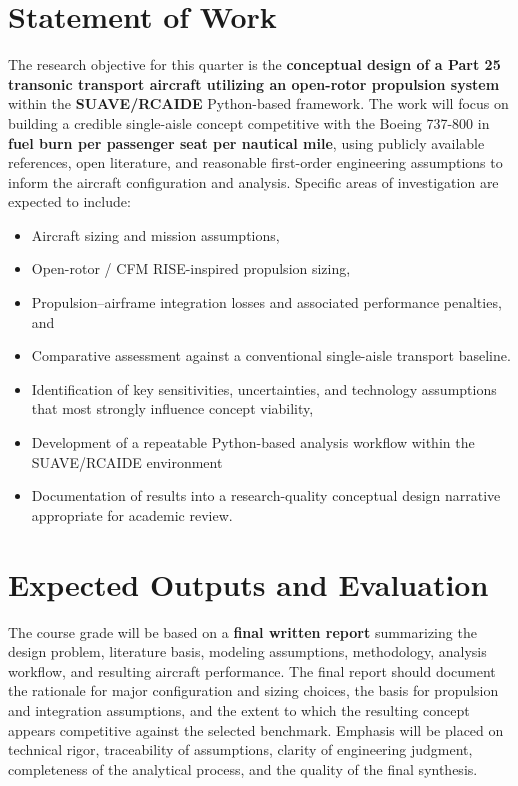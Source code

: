 \documentclass[10pt]{article}
\begin{document}
\section*{Statement of Work}
The research objective for this quarter is the \textbf{conceptual design of a Part 25 transonic transport aircraft utilizing an open-rotor propulsion system} within the \textbf{SUAVE/RCAIDE} Python-based framework. The work will focus on building a credible single-aisle concept competitive with the Boeing 737-800 in \textbf{fuel burn per passenger seat per nautical mile}, using publicly available references, open literature, and reasonable first-order engineering assumptions to inform the aircraft configuration and analysis. Specific areas of investigation are expected to include:
\begin{itemize}
    \item Aircraft sizing and mission assumptions,
    \item Open-rotor / CFM RISE-inspired propulsion sizing,
    \item Propulsion--airframe integration losses and associated performance penalties, and
    \item Comparative assessment against a conventional single-aisle transport baseline.
    \item Identification of key sensitivities, uncertainties, and technology assumptions that most strongly influence concept viability,
    \item Development of a repeatable Python-based analysis workflow within the SUAVE/RCAIDE environment
    \item Documentation of results into a research-quality conceptual design narrative appropriate for academic review.
\end{itemize}

\section*{Expected Outputs and Evaluation}
The course grade will be based on a \textbf{final written report} summarizing the design problem, literature basis, modeling assumptions, methodology, analysis workflow, and resulting aircraft performance. The final report should document the rationale for major configuration and sizing choices, the basis for propulsion and integration assumptions, and the extent to which the resulting concept appears competitive against the selected benchmark. Emphasis will be placed on technical rigor, traceability of assumptions, clarity of engineering judgment, completeness of the analytical process, and the quality of the final synthesis.
\end{document}
